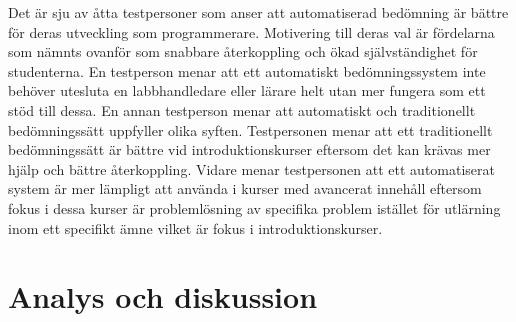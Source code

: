 \documentclass[a4paper,11pt]{article}
\begin{document}
{Det är sju av åtta testpersoner som anser att automatiserad bedömning är bättre för deras utveckling som programmerare. Motivering till deras val är fördelarna som nämnts ovanför som snabbare återkoppling och ökad självständighet för studenterna. En testperson menar att ett automatiskt bedömningssystem inte behöver utesluta en labbhandledare eller lärare helt utan mer fungera som ett stöd till dessa. En annan testperson menar att automatiskt och traditionellt bedömningssätt uppfyller olika syften. Testpersonen menar att ett traditionellt bedömningssätt är bättre vid introduktionskurser eftersom det kan krävas mer hjälp och bättre återkoppling. Vidare menar testpersonen att ett automatiserat system är mer lämpligt att använda i kurser med avancerat innehåll eftersom fokus i dessa kurser är problemlösning av specifika problem istället för utlärning inom ett specifikt ämne vilket är fokus i introduktionskurser.

\newpage
\section{Analys och diskussion}

}
\end{document}
